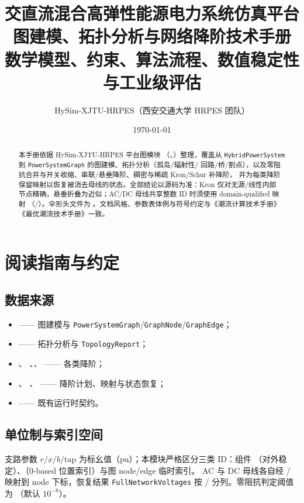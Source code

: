 \documentclass[UTF8,fontset=fandol,a4paper,11pt]{ctexart}
\title{\textbf{交直流混合高弹性能源电力系统仿真平台}\\[0.5em]
       {\Large 图建模、拓扑分析与网络降阶技术手册}\\[0.3em]
       {\large 数学模型、约束、算法流程、数值稳定性与工业级评估}}
\author{HySim-XJTU-HRPES（西安交通大学 HRPES 团队）}
\date{\today}
\begin{document}
\maketitle
\begin{abstract}
\noindent 本手册依据 HySim-XJTU-HRPES 平台图模块
（、）整理，覆盖从
\texttt{HybridPowerSystem} 到 \texttt{PowerSystemGraph} 的图建模、拓扑分析（孤岛/辐射性/
回路/桥/割点），以及零阻抗合并与开关收缩、串联/悬垂降阶、稠密与稀疏 Kron/Schur 补降阶，
并为每类降阶保留映射以恢复被消去母线的状态。全部结论以源码为准：Kron 仅对无源/线性内部
节点精确，悬垂折叠为近似；AC/DC 母线共享整数 ID 时须使用 domain-qualified 映射
（/）。伞形头文件为
。文档风格、参数表体例与符号约定与《潮流计算技术手册》
《最优潮流技术手册》一致。
\end{abstract}

\tableofcontents
\newpage

\section{阅读指南与约定}
\subsection{数据来源}
\begin{itemize}
  \item {} —— 图建模与
        \texttt{PowerSystemGraph}/\allowbreak\texttt{GraphNode}/\allowbreak\texttt{GraphEdge}；
  \item {} —— 拓扑分析与
        \texttt{TopologyReport}；
  \item {}、
        、、
         —— 各类降阶；
  \item {}、
        、 —— 降阶计划、映射与状态恢复；
  \item {} —— 既有运行时契约。
\end{itemize}

\subsection{单位制与索引空间}
支路参数 $r/x/b/\text{tap}$ 为标幺值（pu）；本模块严格区分三类 ID：组件
（对外稳定）、（0-based 位置索引）与图 node/edge 临时索引。
AC 与 DC 母线各自经 / 映射到
node 下标，恢复结果 \texttt{FullNetworkVoltages} 按 /
分列。零阻抗判定阈值为 （默认 $10^{-8}$）。
\end{document}
